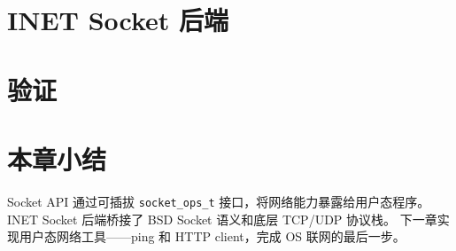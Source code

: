 
\section{INET Socket 后端}
\label{sec:socket-inet}


\section{验证}
\label{sec:socket-verify}


\section{本章小结}

Socket API 通过可插拔 \texttt{socket\_ops\_t} 接口，将网络能力暴露给用户态程序。
INET Socket 后端桥接了 BSD Socket 语义和底层 TCP/UDP 协议栈。
下一章实现用户态网络工具——ping 和 HTTP client，完成 OS 联网的最后一步。
